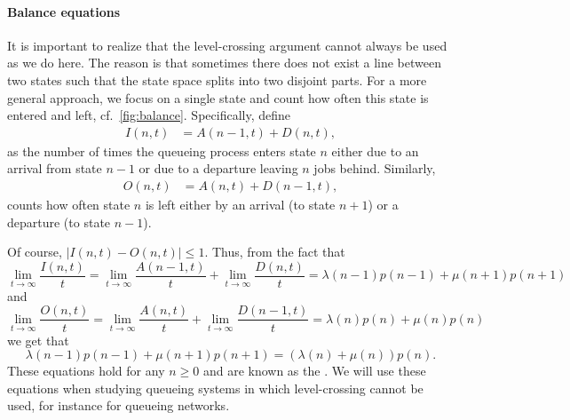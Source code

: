 \paragraph{Balance equations}

It is important to realize that the level-crossing argument cannot always be used as we do here.
The reason is that sometimes there does not exist a line between two states such that the state space splits into two disjoint parts.
For a more general approach, we focus on a single state and count how often this state is entered and left, cf.~\cref{fig:balance}.
Specifically, define
\begin{align*}
 I(n,t) &= A(n-1,t) + D(n,t),
\end{align*}
as the number of times the queueing process enters state $n$ either
due to an arrival from state $n-1$ or due to a departure leaving $n$
jobs behind. Similarly,
\begin{align*}
 O(n,t) &= A(n,t) + D(n-1,t),
\end{align*}
counts how often state $n$ is left either by an arrival (to state $n+1$) or a departure (to state $n-1$).

Of course, $|I(n,t)-O(n,t)|\leq 1$. Thus, from the fact that
\begin{equation*}
\lim_{t\to\infty} \frac{I(n,t)}t = \lim_{t\to\infty} \frac{A(n-1,t)}t + \lim_{t\to\infty} \frac{D(n,t)}t = \lambda(n-1) p(n-1) + 
\mu(n+1) p(n+1)
\end{equation*}
and 
\begin{equation*}
\lim_{t\to\infty} \frac{O(n,t)}t = \lim_{t\to\infty} \frac{A(n,t)}t + \lim_{t\to\infty} \frac{D(n-1,t)}t = \lambda(n) p(n) + 
\mu(n) p(n)
\end{equation*}
we get that
\begin{equation*}
 \lambda(n-1)p(n-1)+\mu(n+1)p(n+1) = (\lambda(n)+\mu(n))p(n).
\end{equation*}
These equations hold for any $n\geq 0$ and are known as the
. We will use these equations when studying
queueing systems in which level-crossing cannot be used, for instance
for queueing networks.

